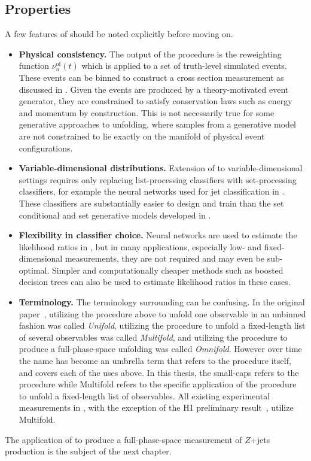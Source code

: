 \subsection{Properties}
\label{sec:omnifold-properties}

A few features of \Omnifold should be noted explicitly before moving on.
\begin{itemize}
  \item \textbf{Physical consistency.}
    The output of the procedure is the reweighting function $\nu^{\mathrm{of}}_n(t)$ which is applied to a set of truth-level simulated events.
    These events can be binned to construct a cross section measurement as discussed in .
    Given the events are produced by a theory-motivated event generator, they are constrained to satisfy conservation laws such as energy and momentum by construction.
    This is not necessarily true for some generative approaches to unfolding, where samples from a generative model are not constrained to lie exactly on the manifold of physical event configurations.

  \item \textbf{Variable-dimensional distributions.}
    Extension of \Omnifold to variable-dimensional settings requires only replacing list-processing classifiers with set-processing classifiers, for example the neural networks used for jet classification in .
    These classifiers are substantially easier to design and train than the set conditional and set generative models developed in .

  \item \textbf{Flexibility in classifier choice.}
    Neural networks are used to estimate the likelihood ratios in , but in many applications, especially low- and fixed-dimensional measurements, they are not required and may even be sub-optimal.
    Simpler and computationally cheaper methods such as boosted decision trees can also be used to estimate likelihood ratios in these cases.

  \item \textbf{Terminology.}
    The terminology surrounding \Omnifold can be confusing.
    In the original paper~\cite{Andreassen:2019cjw}, utilizing the procedure above to unfold one observable in an unbinned fashion was called \textit{Unifold}, utilizing the procedure to unfold a fixed-length list of several observables was called \textit{Multifold}, and utilizing the procedure to produce a full-phase-space unfolding was called \textit{Omnifold}.
    However over time the name \Omnifold has become an umbrella term that refers to the procedure itself, and covers each of the uses above.
    In this thesis, the small-caps \Omnifold refers to the procedure while Multifold refers to the specific application of the procedure to unfold a fixed-length list of observables.
    All existing experimental measurements in , with the exception of the H1 preliminary result~\cite{H1:prelim}, utilize Multifold.
\end{itemize}

The application of \Omnifold to produce a full-phase-space measurement of $Z$+jets production is the subject of the next chapter.
